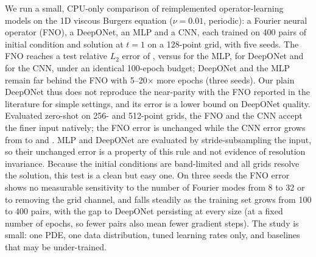 We run a small, CPU-only comparison of reimplemented operator-learning models on the 1D viscous Burgers equation ($\nu=0.01$, periodic): a Fourier neural operator (FNO), a DeepONet, an MLP and a CNN, each trained on 400 pairs of initial condition and solution at $t=1$ on a 128-point grid, with five seeds. The FNO reaches a test relative $L_2$ error of , versus  for the MLP,  for DeepONet and  for the CNN, under an identical 100-epoch budget; DeepONet and the MLP remain far behind the FNO with 5--20$\times$ more epochs (three seeds). Our plain DeepONet thus does not reproduce the near-parity with the FNO reported in the literature for simple settings, and its error is a lower bound on DeepONet quality. Evaluated zero-shot on 256- and 512-point grids, the FNO and the CNN accept the finer input natively; the FNO error is unchanged while the CNN error grows from  to  and . MLP and DeepONet are evaluated by stride-subsampling the input, so their unchanged error is a property of this rule and not evidence of resolution invariance. Because the initial conditions are band-limited and all grids resolve the solution, this test is a clean but easy one. On three seeds the FNO error shows no measurable sensitivity to the number of Fourier modes from 8 to 32 or to removing the grid channel, and falls steadily as the training set grows from 100 to 400 pairs, with the gap to DeepONet persisting at every size (at a fixed number of epochs, so fewer pairs also mean fewer gradient steps). The study is small: one PDE, one data distribution, tuned learning rates only, and baselines that may be under-trained.
